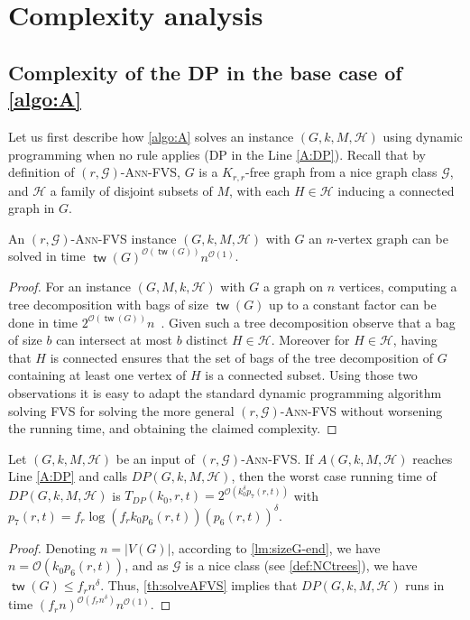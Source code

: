 \documentclass{amsart}
\newcommand{\G}{\mathcal{G}}
\newcommand{\mH}{\mathcal{H}}
\newcommand{\tdp}{T_{DP}}
\DeclareMathOperator\tw{\textsf{tw}}
\newcommand{\FVS}{\textsc{FVS}\xspace}
\newcommand{\AFVS}{\textsc{$(r,\G)$-Ann-FVS}\xspace}
\renewcommand{\O}{\mathcal{O}}
\begin{document}
\section{Complexity analysis}\label{sec:analysis}

\subsection{Complexity of the DP in the base case of \autoref{algo:A}}
Let us first describe how \autoref{algo:A} solves an instance  $(G, k, M, \mH)$ using dynamic programming when no rule applies (DP in the Line \ref{A:DP}). Recall that by definition of \AFVS, $G$ is a $K_{r,r}$-free graph from a nice graph class $\G$, and $\mH$ a family of disjoint subsets of $M$, with each $H\in \mH$ inducing a connected graph in $G$. 



\begin{theorem}\label{th:solveAFVS}
    An \AFVS instance $(G, k, M, \mH)$ with $G$ an $n$-vertex graph can be solved in time $\tw(G)^{\O(\tw (G))}n^{\O(1)}$.
\end{theorem}
\begin{proof}
For an instance $(G, M, k, \mH)$ with $G$ a graph on $n$ vertices, computing a tree decomposition with bags of size $\tw(G)$ up to a constant factor can be done in time $2^{\O(\tw(G))}n$~\cite{korhonen2022single}. Given such a tree decomposition observe that a bag of size $b$ can intersect at most $b$ distinct $H\in \mH$. Moreover for $H\in \mH$, having that $H$ is connected ensures that the set of bags of the tree decomposition of $G$ containing at least one vertex of $H$ is a connected subset. Using those two observations it is easy to adapt the standard dynamic programming algorithm solving \FVS for solving the more general \AFVS without worsening the running time, and obtaining the claimed complexity.
\end{proof}

\begin{corollary}\label{cor:DP}
Let $(G,k,M,\mH)$ be an input of \AFVS.
If $A(G,k,M,\mH)$ reaches Line \ref{A:DP} and calls
$DP(G,k,M,\mH)$, then the worst case running time of $DP(G,k,M,\mH)$ is  $\tdp(k_0,r,t)=2^{\O\left(k_0^{\delta}p_7(r,t)\right)}$ with $p_7(r,t)=f_r\log (f_rk_0p_6(r,t))(p_6(r,t))^{\delta}$.
\end{corollary}
\begin{proof}
Denoting $n=|V(G)|$, according to \autoref{lm:sizeG-end}, we have $n=\O(k_0p_6(r,t))$, and as $\G$ is a nice class (see \autoref{def:NCtrees}), we have $\tw(G)\leq f_rn^{\delta}$. Thus, \autoref{th:solveAFVS} implies that $DP(G,k,M,\mH)$ runs in time $\left(f_rn\right)^{\O\left(f_rn^{\delta}\right)}n^{\O(1)}$.
\end{proof}
\end{document}
